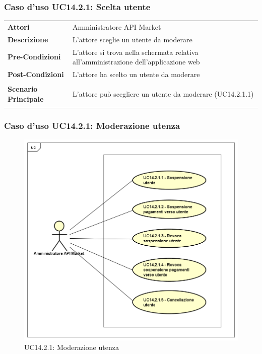 \subsubsection{Caso d'uso UC14.2.1: Scelta utente}
\label{UC14_2_1}

\begin{minipage}{\linewidth}
	\begin{tabular}{ l | p{11cm}}
		\hline
		\rowcolor{Gray}
		\multicolumn{2}{c}{UC14.2.1 - Scelta utente} \\
		\hline
		\textbf{Attori} & Amministratore API Market \\
		\textbf{Descrizione} & L'attore sceglie un utente da moderare \\
		\textbf{Pre-Condizioni} & L'attore si trova nella schermata relativa all'amministrazione dell'applicazione web \\
		\textbf{Post-Condizioni} & L'attore ha scelto un utente da moderare \\
		\textbf{Scenario Principale} & 
		\begin{enumerate*}[label=(\arabic*.),itemjoin={\newline}]
			\item L'attore può scegliere un utente da moderare (UC14.2.1.1)
		\end{enumerate*}\\
	\end{tabular}
\end{minipage}

\newpage
\subsubsection{Caso d'uso UC14.2.1: Moderazione utenza}
\label{UC14_2_1}
\begin{figure}[ht]
	\centering
	\includegraphics[scale=0.45]{UML/UC14_2_1.png}
	\caption{UC14.2.1: Moderazione utenza}
\end{figure}

